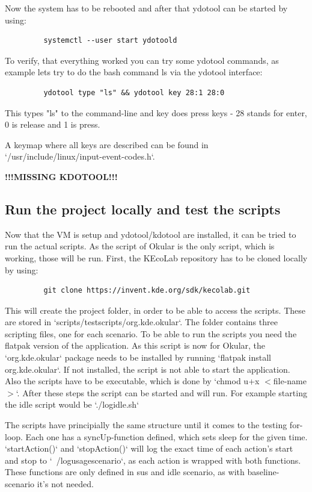 \documentclass{article}
\begin{document}
        Now the system has to be rebooted and after that ydotool can be started by using:
        \begin{lstlisting}
         systemctl --user start ydotoold
        \end{lstlisting}

        To verify, that everything worked you can try some ydotool commands, as example lets try to do the bash command ls via the  ydotool interface:
        \begin{lstlisting}
         ydotool type "ls" && ydotool key 28:1 28:0
        \end{lstlisting}
        This types "ls" to the command-line and key does press keys - 28 stands for enter, 0 is release and 1 is press.

        A keymap where all keys are described can be found in `/usr/include/linux/input-event-codes.h`.

        \textbf{!!!MISSING KDOTOOL!!!}
        \newline

        \subsection{Run the project locally and test the scripts}
        Now that the VM is setup and ydotool/kdotool are installed, it can be tried to run the actual scripts. As the script of Okular is the only script, which is working, those will be run. First, the KEcoLab repository has to be cloned locally by using:
        \begin{lstlisting}
         git clone https://invent.kde.org/sdk/kecolab.git
        \end{lstlisting}
        This will create the project folder, in order to be able to access the scripts. These are stored in `scripts/test\textunderscore scripts/org.kde.okular`. The folder contains three scripting files, one for each scenario.
        To be able to run the scripts you need the flatpak version of the application. As this script is now for Okular, the `org.kde.okular` package
        needs to be installed by running `flatpak install org.kde.okular`.
        If not installed, the script is not able to start the application.
        Also the scripts have to be executable, which is done by `chmod u+x $<$file-name$>$`. After these steps the script can be started and will run.
        For example starting the idle script would be `./log\textunderscore idle.sh`

        The scripts have principially the same structure until it comes to the testing for-loop. Each one has a syncUp-function defined, which sets sleep for the given time.
        `startAction()` and `stopAction()` will log the exact time of each action's start and stop to `~/log\textunderscore usage\textunderscore scenario`, as each action is wrapped with both functions. These functions are only defined in sus and idle scenario, as with baseline-scenario it's not needed.
\end{document}
